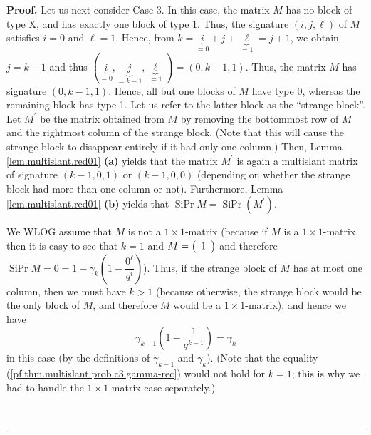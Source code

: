 \documentclass[numbers=enddot,12pt,final,onecolumn,notitlepage]{scrartcl}%
\theoremstyle{definition}
\newenvironment{proof}[1][Proof]{\noindent\textbf{#1.} }{\ \rule{0.5em}{0.5em}}
\theoremstyle{plainsl}
\begin{document}
\begin{proof}
Let us next consider Case 3. In this case, the matrix $M$ has no block of type
X, and has exactly one block of type 1. Thus, the signature $\left(
i,j,\ell\right)  $ of $M$ satisfies $i=0$ and $\ell=1$. Hence, from
$k=\underbrace{i}_{=0}+j+\underbrace{\ell}_{=1}=j+1$, we obtain $j=k-1$ and
thus $\left(  \underbrace{i}_{=0},\underbrace{j}_{=k-1},\underbrace{\ell}%
_{=1}\right)  =\left(  0,k-1,1\right)  $. Thus, the matrix $M$ has signature
$\left(  0,k-1,1\right)  $. Hence, all but one blocks of $M$ have type 0,
whereas the remaining block has type 1. Let us refer to the latter block as
the ``strange block''. Let $M^{\prime}$ be the matrix obtained from $M$ by
removing the bottommost row of $M$ and the rightmost column of the strange
block. (Note that this will cause the strange block to disappear entirely if
it had only one column.) Then, Lemma \ref{lem.multislant.red01} \textbf{(a)}
yields that the matrix $M^{\prime}$ is again a multislant matrix of signature
$\left(  k-1,0,1\right)  $ or $\left(  k-1,0,0\right)  $ (depending on whether
the strange block had more than one column or not). Furthermore, Lemma
\ref{lem.multislant.red01} \textbf{(b)} yields that $\operatorname*{SiPr}%
M=\operatorname*{SiPr}\left(  M^{\prime}\right)  $.

We WLOG assume that $M$ is not a $1\times1$-matrix (because if $M$ is a
$1\times1$-matrix, then it is easy to see that $k=1$ and $M=\left(
\begin{array}
[c]{c}%
1
\end{array}
\right)  $ and therefore $\operatorname*{SiPr}M=0=1-\gamma_{k}\left(
1-\dfrac{0^{\ell}}{q^{i}}\right)  $). Thus, if the strange block of $M$ has at
most one column, then we must have $k>1$ (because otherwise, the strange block
would be the only block of $M$, and therefore $M$ would be a $1\times
1$-matrix), and hence we have
\begin{equation}
\gamma_{k-1}\left(  1-\dfrac{1}{q^{k-1}}\right)  =\gamma_{k}
\label{pf.thm.multislant.prob.c3.gamma-rec}%
\end{equation}
in this case (by the definitions of $\gamma_{k-1}$ and $\gamma_{k}$). (Note
that the equality (\ref{pf.thm.multislant.prob.c3.gamma-rec}) would not hold
for $k=1$; this is why we had to handle the $1\times1$-matrix case separately.)


\end{proof}
\end{document}
